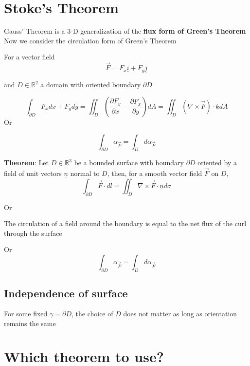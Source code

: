 \section{Stoke's Theorem}

Gauss' Theorem is a 3-D generalization of the \textbf{flux form of Green's Theorem}\\

Now we consider the circulation form of Green's Theorem

For a vector field
\[
  \vec{F} = F_x \underline{i} + F_y \underline{j}
\] 

and $D \in \mathbb{R}^2$ a domain with oriented boundary $\partial D$

\[
  \int_{\partial D}^{} F_x dx + F_y dy = \iint_D \left( \frac{\partial F_y}{\partial x} - \frac{\partial F_x}{\partial y} \right) dA = \iint_D \left( \nabla \times \vec{F} \right) \cdot \underline{k} dA
\] 
Or

\[
   \int_{\partial D}^{}  \alpha_{\vec{F}} = \int_{D}^{} d \alpha_{\vec{F}}  
\] 

\begin{framed}
   \textbf{Theorem}: Let $D \in \mathbb{R}^3$ be a bounded surface with boundary $\partial D$ oriented by a field of unit vectors $ \underline{n} $ normal to $D$, then, for a smooth vector field $ \vec{F}$ on $D$, 
   \[
   \int_{\partial D}^{} \vec{F} \cdot d l = \iint_{D} \nabla \times \vec{F} \cdot \underline{n} d \sigma  
   \] 

   Or

   The circulation of a field around the boundary is equal to the net flux of the curl through the surface 

   Or
   \[
      \int_{\partial D}^{ } \alpha_{\vec{F}} = \int_{D}^{} d \alpha_{\vec{F}} 
   \] 

\end{framed}

\subsection{Independence of surface}

For some fixed $\gamma = \partial D$, the choice of $D$ does not matter as long as orientation remains the same


\section{Which theorem to use?}
